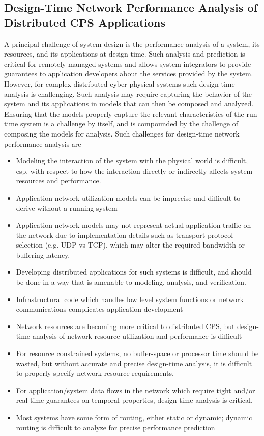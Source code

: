\subsection{Design-Time Network Performance Analysis of Distributed CPS Applications}
A principal challenge of system design is the performance analysis of
a system, its resources, and its applications at design-time.  Such
analysis and prediction is critical for remotely managed systems and
allows system integrators to provide guarantees to application
developers about the services provided by the system.  However, for
complex distributed cyber-physical systems such design-time analysis
is challenging.  Such analysis may require capturing the behavior of
the system and its applications in models that can then be composed
and analyzed.  Ensuring that the models properly capture the relevant
characteristics of the run-time system is a challenge by itself, and
is compounded by the challenge of composing the models for analysis.
Such challenges for design-time network performance analysis are
\begin{itemize}
\item Modeling the interaction of the system with the physical world
  is difficult, esp. with respect to how the interaction directly or
  indirectly affects system resources and performance.
\item Application network utilization models can be imprecise and
  difficult to derive without a running system
\item Application network models may not represent actual application
  traffic on the network due to implementation details such as
  transport protocol selection (e.g. UDP vs TCP), which may alter the
  required bandwidth or buffering latency.
\item Developing distributed applications for such systems is
  difficult, and should be done in a way that is amenable to modeling,
  analysis, and verification.
\item Infrastructural code which handles low level system functions or
  network communications complicates application development
\item Network resources are becoming more critical to distributed CPS,
  but design-time analysis of network resource utilization and
  performance is difficult
\item For resource constrained systems, no buffer-space or processor
  time should be wasted, but without accurate and precise design-time
  analysis, it is difficult to properly specify network resource
  requirements.
\item For application/system data flows in the network which require
  tight and/or real-time guarantees on temporal properties,
  design-time analysis is critical.
\item Most systems have some form of routing, either static or
  dynamic; dynamic routing is difficult to analyze for precise
  performance prediction
\end{itemize}

